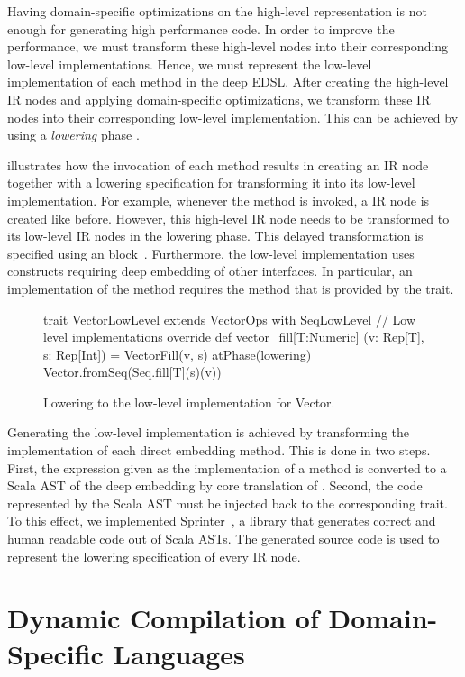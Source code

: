 Having domain-specific optimizations on the high-level representation is not
enough for generating high performance code. In order to improve the
performance, we must transform these high-level nodes into their corresponding
low-level implementations. Hence, we must represent the low-level
implementation of each method in the deep EDSL. After creating the high-level
IR nodes and applying domain-specific optimizations, we transform these IR
nodes into their corresponding low-level implementation. This can be achieved by
using a \emph{lowering} phase \cite{rompf_optimizing_2013}.

 illustrates how the invocation of each method
results in creating an IR node together with a lowering specification for
transforming it into its low-level implementation. For example, whenever the
method  is invoked, a  IR node is created like
before. However, this high-level IR node needs to be transformed to its low-level
IR nodes in the lowering phase. This delayed transformation is specified
using an  block~\cite{rompf_optimizing_2013}.
Furthermore, the low-level implementation uses constructs requiring deep
embedding of other interfaces. In particular, an implementation of the
 method requires the  method that is provided by
the  trait.
\begin{figure}[ht]
\begin{listingtiny}
trait VectorLowLevel extends VectorOps
  with SeqLowLevel {
  // Low level implementations
  override def vector_fill[T:Numeric]
    (v: Rep[T], s: Rep[Int]) =
    VectorFill(v, s) atPhase(lowering) {
      Vector.fromSeq(Seq.fill[T](s)(v))
    }
}
\end{listingtiny}
\caption{\label{lst:vector_deep_low} Lowering to the low-level implementation for Vector.}
\end{figure}

Generating the low-level implementation is achieved by transforming the
implementation of each direct embedding method. This is done in two steps.
First, the expression given as the implementation of a method is converted to
a Scala AST of the deep embedding by core translation of \yy. Second, the
code represented by the Scala AST must be injected back to the corresponding
trait. To this effect, we implemented Sprinter~\cite{sprinter}, a library that generates
correct and human readable code out of Scala ASTs. The generated source code
is used to represent the lowering specification of every IR node.

\chapter{Dynamic Compilation of Domain-Specific Languages}
\label{sec:dynamic-compilation}
